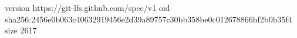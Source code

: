 version https://git-lfs.github.com/spec/v1
oid sha256:2456e0b063c40632919456e2d39a89757c30bb358be0c012678866bf2b0b35f4
size 2617
